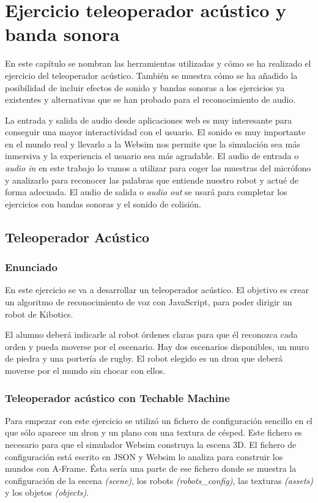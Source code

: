 \chapter{Ejercicio teleoperador acústico y banda sonora}\label{audio}
En este capítulo se nombran las herramientas utilizadas y cómo se ha realizado el ejercicio del teleoperador acústico. También se muestra cómo se ha añadido la posibilidad de incluir efectos de sonido y bandas sonoras a los ejercicios ya existentes y alternativas que se han probado para el reconocimiento de audio.

La entrada y salida de audio desde aplicaciones web es muy interesante para conseguir una mayor interactividad con el usuario. El sonido es muy importante en el mundo real y llevarlo a la Websim nos permite que la simulación sea más inmersiva y la experiencia el usuario sea más agradable.
 El audio de entrada o \textit{audio in} en este trabajo  lo vamos a utilizar para coger las muestras del micrófono y analizarlo  para reconocer las palabras que entiende nuestro robot y  actué de forma adecuada. El audio de salida o \textit{audio out} se usará para completar los ejercicios con bandas sonoras y el sonido de colisión.

\section{Teleoperador Acústico}
\subsection{Enunciado}  
En este ejercicio se va a desarrollar un teleoperador acústico. El objetivo es crear un algoritmo de reconocimiento de voz con JavaScript, para poder dirigir un robot de Kibotics.

El alumno deberá indicarle  al robot órdenes claras para que él reconozca cada orden  y pueda moverse por el escenario. Hay dos escenarios disponibles, un muro de piedra y una portería de rugby. El robot elegido es un dron que deberá moverse por el mundo sin chocar con ellos.

\subsection{Teleoperador acústico con Techable Machine}

Para empezar con este ejercicio se utilizó un fichero de configuración sencillo en el que sólo aparece un dron y un plano con una textura de césped. Este fichero es necesario para que el simulador Websim construya la escena 3D. El fichero de configuración está escrito en JSON y Websim lo analiza para construir los mundos con A-Frame. 
Ésta sería una parte de ese fichero donde se muestra la configuración de la escena \textit{(scene)}, los robots \textit {(robots\_config)}, las texturas \textit{(assets)} y los objetos \textit{(objects)}.

